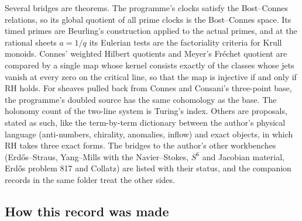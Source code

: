 Several bridges are theorems. The programme's clocks satisfy the Bost--Connes relations, so its global quotient of all prime clocks is the Bost--Connes space. Its timed primes are Beurling's construction applied to the actual primes, and at the rational sheets $a=1/q$ its Eulerian tests are the factoriality criteria for Krull monoids. Connes' weighted Hilbert quotients and Meyer's Fréchet quotient are compared by a single map whose kernel consists exactly of the classes whose jets vanish at every zero on the critical line, so that the map is injective if and only if RH holds. For sheaves pulled back from Connes and Consani's three-point base, the programme's doubled source has the same cohomology as the base. The holonomy count of the two-line system is Turing's index.
Others are proposals, stated as such, like the term-by-term dictionary between the author's physical language (anti-numbers, chirality, anomalies, inflow) and exact objects, in which RH takes three exact forms.
The bridges to the author's other workbenches (Erdős--Straus, Yang--Mills with the Navier--Stokes, $S^6$ and Jacobian material, Erdős problem 817 and Collatz) are listed with their status, and the companion records in the same folder treat the other sides.

\subsection*{How this record was made}

